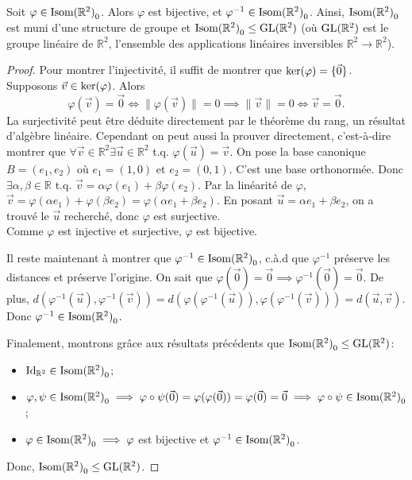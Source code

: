 \documentclass{book}
\numberwithin{equation}{section}
\renewcommand{\phi}{\varphi}
\providecommand{\plan}{{\mathbb R^2}}
\providecommand{\origin}{{\vec 0}}
\providecommand{\id}{{\textnormal{Id}}}
\providecommand{\idR}{{\id_\plan}}
\providecommand{\isom}{{\textnormal{Isom}(\plan)}}
\providecommand{\isomo}{{\isom_0}}
\providecommand{\ker}{{\textnormal{ker}}}
\providecommand{\longueur}[1]{{\lVert#1\rVert}}
\providecommand{\subgroupeq}{\leq}
\begin{document}
\begin{thm}
	Soit $\phi \in \isomo$. Alors $\phi$ est bijective, et $\phi^{-1} \in \isomo$. Ainsi, $\isomo$ est muni d'une structure de groupe et $\isomo \subgroupeq \textnormal{GL}(\plan)$ (où $\textnormal{GL}(\plan)$ est le groupe linéaire de $\plan$, l'ensemble des applications linéaires inversibles $\plan \to \plan$).
\end{thm}
\begin{proof}
	Pour montrer l'injectivité, il suffit de montrer que $\ker(\phi) = \{\origin\}$. Supposons $\vec v \in \ker(\phi)$. Alors
	\begin{equation*}
		\phi(\vec v) = \origin \iff \longueur{\phi(\vec v)} = 0 \implies \longueur{\vec v} = 0 \iff \vec v = \origin.
	\end{equation*}
	La surjectivité peut être déduite directement par le théorème du rang, un résultat d'algèbre linéaire. Cependant on peut aussi la prouver directement, c'est-à-dire montrer que $\forall \vec v \in \plan \exists \vec u \in \plan$ t.q. $\phi(\vec u) = \vec v$. On pose la base canonique $B = (e_1, e_2)$ où $e_1 = (1, 0)$ et $e_2 = (0, 1)$. C'est une base orthonormée. Donc $\exists \alpha, \beta \in \mathbb R$ t.q. $\vec v = \alpha \phi(e_1) + \beta \phi(e_2)$. Par la linéarité de $\phi$, $\vec v = \phi(\alpha e_1) + \phi(\beta e_2) = \phi(\alpha e_1 + \beta e_2)$. En posant $\vec u = \alpha e_1 + \beta e_2$, on a trouvé le $\vec u$ recherché, donc $\phi$ est surjective.\\
	Comme $\phi$ est injective et surjective, $\phi$ est bijective.\par
	Il reste maintenant à montrer que $\phi^{-1} \in \isomo$, c.à.d que $\phi^{-1}$ préserve les distances et préserve l'origine. On sait que $\phi(\origin) = \origin \implies \phi^{-1}(\origin) = \origin$. De plus, $d(\phi^{-1}(\vec u), \phi^{-1}(\vec v)) = d(\phi(\phi^{-1}(\vec u)), \phi(\phi^{-1}(\vec v))) = d(\vec u, \vec v)$. Donc $\phi^{-1} \in \isomo$.\par
	Finalement, montrons grâce aux résultats précédents que $\isomo \subgroupeq \textnormal{GL}(\plan)$:
	\begin{itemize}
		\item $\idR \in \isomo$;
		\item $\phi, \psi \in \isomo \implies \phi \circ \psi(\origin) = \phi(\phi(\origin)) = \phi(\origin) = \origin \implies \phi \circ \psi \in \isomo$;
		\item $\phi \in \isomo \implies \phi$ est bijective et $\phi^{-1} \in \isomo$.
	\end{itemize}
	Donc, $\isomo \subgroupeq \textnormal{GL}(\plan)$.
\end{proof}
\end{document}
